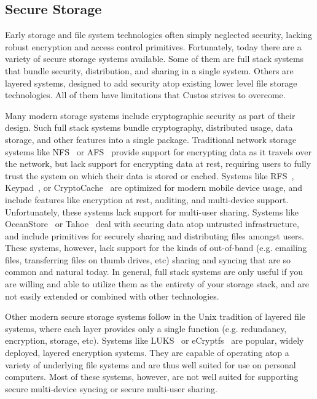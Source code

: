 \subsection{Secure Storage}

Early storage and file system technologies often simply neglected
security, lacking robust encryption and access control primitives.
Fortunately, today there are a variety of secure storage systems
available. Some of them are full stack systems that bundle security,
distribution, and sharing in a single system. Others are layered
systems, designed to add security atop existing lower level file
storage technologies. All of them have limitations that Custos strives
to overcome.

Many modern storage systems include cryptographic security as part of
their design. Such full stack systems bundle cryptography, distributed
usage, data storage, and other features into a single
package. Traditional network storage systems like
NFS~\cite{Sandberg1985} or AFS~\cite{Howard1988} provide support for
encrypting data as it travels over the network, but lack support for
encrypting data at rest, requiring users to fully trust the system on
which their data is stored or cached. Systems like
RFS~\cite{Dong2011}, Keypad~\cite{Geambasu2011}, or
CryptoCache~\cite{Jensen2000} are optimized for modern mobile device
usage, and include features like encryption at rest, auditing, and
multi-device support. Unfortunately, these systems lack support for
multi-user sharing. Systems like OceanStore~\cite{Kubiatowicz2000} or
Tahoe~\cite{Wilcox-O'Hearn2008} deal with securing data atop untrusted
infrastructure, and include primitives for securely sharing and
distributing files amongst users. These systems, however, lack support
for the kinds of out-of-band (e.g. emailing files, transferring files
on thumb drives, etc) sharing and syncing that are so common and
natural today. In general, full stack systems are only useful if you
are willing and able to utilize them as the entirety of your storage
stack, and are not easily extended or combined with other
technologies.

Other modern secure storage systems follow in the Unix tradition of
layered file systems, where each layer provides only a single function
(e.g. redundancy, encryption, storage, etc). Systems like
LUKS~\cite{luks} or eCryptfs~\cite{eCryptfs, Halcrow} are popular,
widely deployed, layered encryption systems. They are capable of
operating atop a variety of underlying file systems and are thus well
suited for use on personal computers. Most of these systems, however,
are not well suited for supporting secure multi-device syncing or
secure multi-user sharing.


